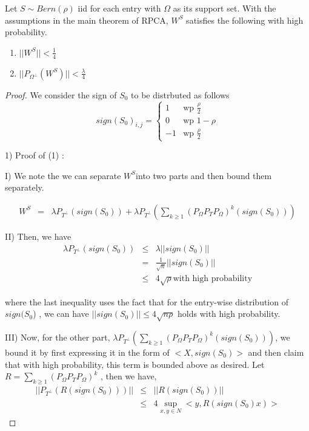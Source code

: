 \begin{thm}
Let $S\sim Bern(\rho)$ iid for each entry with $\Omega$ as its support set. With the assumptions in the main theorem of RPCA, $W^{S}$ satisfies the following with high probability. 
\begin{enumerate}
\item $||W^{S}||<\frac{1}{4}$ 
\item $||P_{\Omega^{\bot}}(W^{S})||<\frac{\lambda}{4}$ 
\end{enumerate}
\end{thm}
\begin{proof}
We consider the sign of $S_{0}$ to be distrbuted as follows 
\[
sign(S_{0})_{i,j}=\begin{cases}
1 & \text{wp }\frac{\rho}{2}\\
0 & \text{wp }1-\rho\\
-1 & \text{wp }\frac{\rho}{2}
\end{cases}
\]


1) Proof of (1) :

I) We note the we can separate $W^{S}$into two parts and then bound them separately. 

\begin{eqnarray*}
W^{S} & = & \lambda P_{T^{\bot}}(sign(S_{0}))+\lambda P_{T^{\bot}}(\sum_{k\ge1}(P_{\Omega}P_{T}P_{\Omega})^{k}(sign(S_{0})))
\end{eqnarray*}


II) Then, we have 
\begin{eqnarray*}
\lambda P_{T^{\bot}}(sign(S_{0})) & \le & \lambda||sign(S_{0})||\\
 & = & \frac{1}{\sqrt{n}}||sign(S_{0})||\\
 & \le & 4\sqrt{\rho}\text{with high probability}
\end{eqnarray*}


where the last inequality uses the fact that for the entry-wise distribution of $sign(S_{0}$) , we can have $||sign(S_{0})||\le4\sqrt{n\rho}$ holds with high probability. 

III) Now, for the other part, $\lambda P_{T^{\bot}}(\sum_{k\ge1}(P_{\Omega}P_{T}P_{\Omega})^{k}(sign(S_{0})))$, we bound it by first expressing it in the form of $<X,sign(S_{0})>$ and then claim that with high probability, this term is bounded above as desired. Let $R=\sum_{k\ge1}(P_{\Omega}P_{T}P_{\Omega})^{k}$ ,
then we have, 
\begin{eqnarray*}
||P_{T^{\bot}}(R(sign(S_{0})))|| & \le & ||R(sign(S_{0}))||\\
 & \le & 4\sup_{x,y\in N}<y,R(sign(S_{0})x)>
\end{eqnarray*}



\end{proof}
